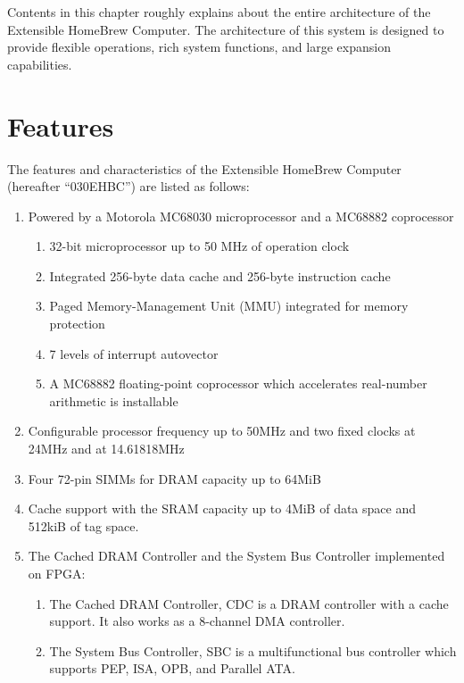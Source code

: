 \documentclass[11pt]{report}
\begin{document}
\begin{flushleft}
    Contents in this chapter roughly explains about the entire architecture of
    the  Extensible HomeBrew Computer. The architecture of this system is
    designed to provide flexible operations, rich system functions, and large
    expansion capabilities. 
\end{flushleft}

\section{Features}

\begin{flushleft}
    The features and characteristics of the Extensible HomeBrew Computer
    (hereafter ``030EHBC'') are listed as follows:

    \begin{enumerate}
        \item Powered by a Motorola MC68030 microprocessor and a MC68882 coprocessor
        \begin{enumerate}
            \item 32-bit microprocessor up to 50 MHz of operation clock
            \item Integrated 256-byte data cache and 256-byte instruction cache
            \item Paged Memory-Management Unit (MMU) integrated for memory protection
            \item 7 levels of interrupt autovector
            \item A MC68882 floating-point coprocessor which accelerates real-number arithmetic is installable
        \end{enumerate}
        \item Configurable processor frequency up to 50MHz and two fixed clocks at 24MHz and at 14.61818MHz
        \item Four 72-pin SIMMs for DRAM capacity up to 64MiB
        \item Cache support with the SRAM capacity up to 4MiB of data space and 512kiB of tag space.
        \item The Cached DRAM Controller and the System Bus Controller implemented on FPGA:
        \begin{enumerate}
            \item The Cached DRAM Controller, CDC is a DRAM controller with a cache support. It also works as a 8-channel DMA controller.
            \item The System Bus Controller, SBC is a multifunctional bus controller which supports PEP, ISA, OPB, and Parallel ATA.

\end{enumerate}
\end{enumerate}
\end{flushleft}
\end{document}
